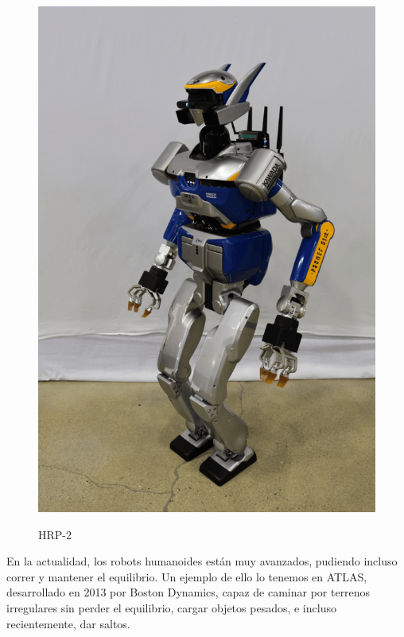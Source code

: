 \begin{figure}[H]
\centering
{\includegraphics[scale=0.2]{imagenes/apartado_2/213_HRP_2}}
\caption{HRP-2}
\label{figura213}
\end{figure}

En la actualidad, los robots humanoides están muy avanzados, pudiendo incluso correr y mantener el equilibrio. Un ejemplo de ello lo tenemos en ATLAS, desarrollado en 2013 por Boston Dynamics, capaz de caminar por terrenos irregulares sin perder el equilibrio, cargar objetos pesados, e incluso recientemente, dar saltos.

